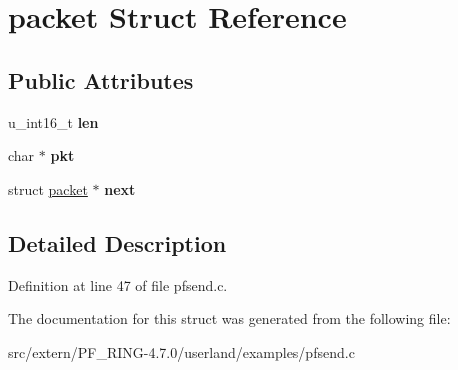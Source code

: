 \hypertarget{structpacket}{
\section{packet Struct Reference}
\label{structpacket}
}
\subsection*{Public Attributes}
\begin{DoxyCompactItemize}
\item 
\hypertarget{structpacket_ae76e28ec9f532d45c72ed938fd9dee86}{
u\_\-int16\_\-t {\bfseries len}}
\label{structpacket_ae76e28ec9f532d45c72ed938fd9dee86}

\item 
\hypertarget{structpacket_a265041326b73dd98015be7451ab739c3}{
char $\ast$ {\bfseries pkt}}
\label{structpacket_a265041326b73dd98015be7451ab739c3}

\item 
\hypertarget{structpacket_a4f3c40d14afa3452e4f47a399541f8ce}{
struct \hyperlink{structpacket}{packet} $\ast$ {\bfseries next}}
\label{structpacket_a4f3c40d14afa3452e4f47a399541f8ce}

\end{DoxyCompactItemize}


\subsection{Detailed Description}


Definition at line 47 of file pfsend.c.



The documentation for this struct was generated from the following file:\begin{DoxyCompactItemize}
\item 
src/extern/PF\_\-RING-\/4.7.0/userland/examples/pfsend.c\end{DoxyCompactItemize}
